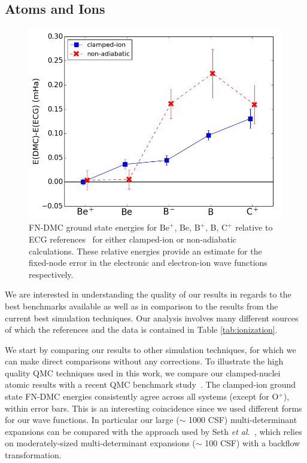 \documentclass[pra,superscriptaddress,groupedaddress,twocolumn]{revtex4}
\begin{document}
\subsection{Atoms and Ions}

\begin{figure}[t]
\centering
\includegraphics[scale=.4]{Figures/atom-ECG}
\caption{FN-DMC ground state energies for $\text{Be}^+$, Be, $\text{B}^+$, B, $\text{C}^+$ relative to ECG references~\cite{Stanke_Be,Puchalski_Be+,Bubin_BeH_noBO,Bubin_B,Bubin_B+,Bubin_C+} for either clamped-ion or non-adiabatic calculations. These relative energies provide an estimate for the fixed-node error in the electronic and electron-ion wave functions respectively.\label{fig:atom-ECG}}
\end{figure}

We are interested in understanding the quality of our results in regards to the best benchmarks available as well as in comparison to the results from the current best simulation techniques. Our analysis involves many different sources of which the references and the data is contained in Table \ref{tab:ionization}. 

We start by comparing our results to other simulation techniques, for which we can make direct comparisons without any corrections.  To illustrate the high quality QMC techniques used in this work, we compare our clamped-nuclei atomic results with a recent QMC benchmark study~\cite{Seth_Bench}. The clamped-ion ground state FN-DMC energies consistently agree across all systems (except for O$^{+}$), within error bars. This is an interesting coincidence since we used different forms for our wave functions. In particular our large ($\sim$ 1000 CSF) multi-determinant expansions can be compared with the approach used by Seth {\it et al.}~\cite{Seth_Bench}, which relies on moderately-sized multi-determinant expansions ($\sim$ 100 CSF) with a backflow transformation.       
\end{document}
